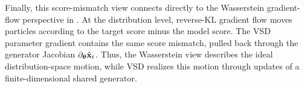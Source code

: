 Finally, this score-mismatch view connects directly to the Wasserstein
gradient-flow perspective in .
At the distribution level, reverse-KL gradient flow moves particles according
to the target score minus the model score. The VSD parameter gradient contains
the same score mismatch, pulled back through the generator Jacobian
$\partial_{{\bm{\theta}}}\hat{{\mathbf{x}}}_t$. Thus, the Wasserstein view describes the ideal
distribution-space motion, while VSD realizes this motion through updates of a
finite-dimensional shared generator.




